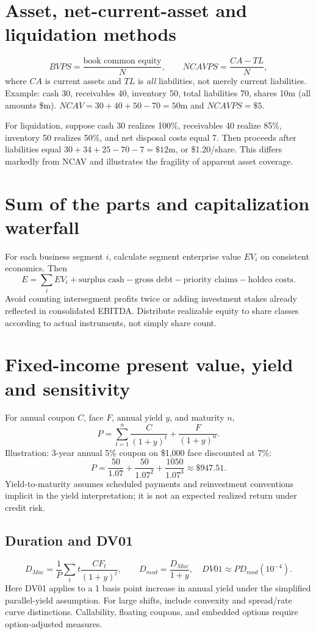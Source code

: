 \documentclass[11pt,letterpaper]{article}
\begin{document}
\section{Asset, net-current-asset and liquidation methods}
\[
BVPS=\frac{\text{book common equity}}{N},\qquad
NCAVPS=\frac{CA-TL}{N},
\]
where $CA$ is current assets and $TL$ is \emph{all} liabilities, not merely current liabilities. Example: cash 30, receivables 40, inventory 50, total liabilities 70, shares 10m (all amounts \$m). $NCAV=30+40+50-70=50$m and $NCAVPS=\$5$.

For liquidation, suppose cash 30 realizes 100\%, receivables 40 realize 85\%, inventory 50 realizes 50\%, and net disposal costs equal 7. Then proceeds after liabilities equal $30+34+25-70-7=\$12$m, or \$1.20/share. This differs markedly from NCAV and illustrates the fragility of apparent asset coverage.

\section{Sum of the parts and capitalization waterfall}
For each business segment $i$, calculate segment enterprise value $EV_i$ on consistent economics. Then
\[
E=\sum_i EV_i+\text{surplus cash}-\text{gross debt}-\text{priority claims}-\text{holdco costs}.
\]
Avoid counting intersegment profits twice or adding investment stakes already reflected in consolidated EBITDA. Distribute realizable equity to share classes according to actual instruments, not simply share count.

\section{Fixed-income present value, yield and sensitivity}
For annual coupon $C$, face $F$, annual yield $y$, and maturity $n$,
\[
P=\sum_{t=1}^{n}\frac{C}{(1+y)^t}+\frac{F}{(1+y)^n}.
\]
Illustration: 3-year annual 5\% coupon on \$1,000 face discounted at 7\%:
\[
P=\frac{50}{1.07}+\frac{50}{1.07^2}+\frac{1050}{1.07^3}\approx\$947.51.
\]
Yield-to-maturity assumes scheduled payments and reinvestment conventions implicit in the yield interpretation; it is not an expected realized return under credit risk.

\subsection{Duration and DV01}
\[
D_{Mac}=\frac{1}{P}\sum_t t\frac{CF_t}{(1+y)^t},\qquad
D_{mod}=\frac{D_{Mac}}{1+y},
\quad DV01\approx P D_{mod}(10^{-4}).
\]
Here DV01 applies to a 1 basis point increase in annual yield under the simplified parallel-yield assumption. For large shifts, include convexity and spread/rate curve distinctions. Callability, floating coupons, and embedded options require option-adjusted measures.
\end{document}

